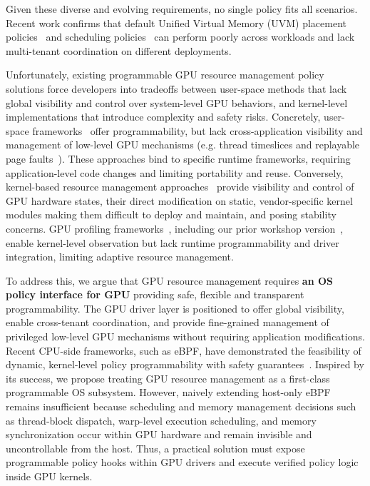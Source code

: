 Given these diverse and evolving requirements, no single policy fits all scenarios. Recent work confirms that default Unified Virtual Memory (UVM) placement policies~\cite{wang2024suv,lin2025forest,kim2025dream,liao2024svm,park2025helm} and scheduling policies~\cite{wang2024gcaps,fan2025gpreempt,kato2011timegraph,shen2025xsched} can perform poorly across workloads and lack multi-tenant coordination on different deployments.

Unfortunately, existing programmable GPU resource management policy solutions force developers into tradeoffs between user-space methods that lack global visibility and control over system-level GPU behaviors, and kernel-level implementations that introduce complexity and safety risks. 
Concretely, user-space frameworks~\cite{ng2023paella,shen2025xsched,gim2025pie,chen2025ktransformers} offer programmability, but lack cross-application visibility and management of low-level GPU mechanisms (e.g. thread timeslices and replayable page faults~\cite{fan2025gpreempt,nvidia-open-gpu}). These approaches bind to specific runtime frameworks, requiring application-level code changes and limiting portability and reuse. Conversely, kernel-based resource management approaches~\cite{kato2011timegraph,kato2012gdev,kernelintercept,fan2025gpreempt,wang2024gcaps} provide visibility and control of GPU hardware states, their direct modification on static, vendor-specific kernel modules making them difficult to deploy and maintain, and posing stability concerns. GPU profiling frameworks~\cite{cupti,villa2019nvbit,neutrino}, including our prior workshop version~\cite{egpu}, enable kernel-level observation but lack runtime programmability and driver integration, limiting adaptive resource management.

To address this, we argue that GPU resource management requires \textbf{an 
OS policy interface for GPU} providing safe, flexible and transparent programmability. The GPU driver layer is positioned to offer global visibility, enable cross-tenant coordination, and provide fine-grained management of privileged low-level GPU mechanisms without requiring application modifications. Recent CPU-side frameworks, such as eBPF, have demonstrated the feasibility of dynamic, kernel-level policy programmability with safety guarantees~\cite{bachl2021flow,Zhong22,jia2023programmable,schedext-docs,zussman2025cache_ext}. Inspired by its success, we propose treating GPU resource management as a first-class programmable OS subsystem. However, naively extending host-only eBPF remains insufficient because scheduling and memory management decisions such as thread-block dispatch, warp-level execution scheduling, and memory synchronization occur within GPU hardware and remain invisible and uncontrollable from the host. Thus, a practical solution must expose programmable policy hooks within GPU drivers and execute verified policy logic inside GPU kernels.

